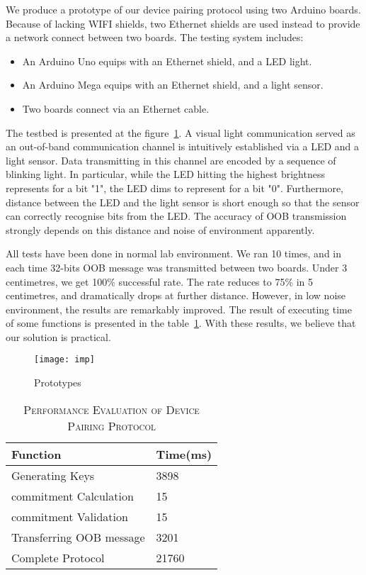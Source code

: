 We produce a prototype of our device pairing protocol using two Arduino boards. Because of lacking WIFI shields, two Ethernet shields are used instead to provide a network connect between two boards. The testing system includes:
\begin{itemize}
\item An Arduino Uno equips with an Ethernet shield, and a LED light.
\item An Arduino Mega equips with an Ethernet shield, and a light sensor.
\item Two boards connect via an Ethernet cable. 
\end{itemize}

The testbed is presented at the figure~\ref{imp}. A visual light communication served as an out-of-band communication channel is intuitively established via a LED and a light sensor. Data transmitting in this channel are encoded by a sequence of blinking light. In particular, while the LED hitting the highest brightness represents for a bit "1", the LED dims to represent for a bit "0". Furthermore, distance between the LED and the light sensor is short enough so that the sensor can correctly recognise bits from the LED. The accuracy of OOB transmission strongly depends on this distance and noise of environment apparently. 

All tests have been done in normal lab environment. We ran 10 times, and in each time 32-bits OOB message was transmitted between two boards. Under 3 centimetres, we get 100\% successful rate. The rate reduces to 75\% in 5 centimetres, and dramatically drops at further distance. However, in low noise environment, the results are remarkably improved. The result of executing time of some functions is presented in the table~\ref{evaluation}. With these results, we believe that our solution is practical.

\begin{figure}
  \centering
  \texttt{[image: imp]}
  \caption{Prototypes}
  \label{imp}
\end{figure}

\begin{table}[t]
\centering
\caption{\textsc{Performance Evaluation of Device Pairing Protocol}}
\label{evaluation}
{\small
\begin{tabular}{| p{5cm} | p{3cm} |}
 \hline
\textbf{Function} & \textbf{Time(ms)} \\ \hline \hline
Generating Keys & 3898 \\ \hline
commitment Calculation & 15 \\ \hline
commitment Validation & 15 \\ \hline
Transferring OOB message & 3201 \\ \hline
Complete Protocol & 21760 \\ \hline
\end{tabular}
}
\end{table}

